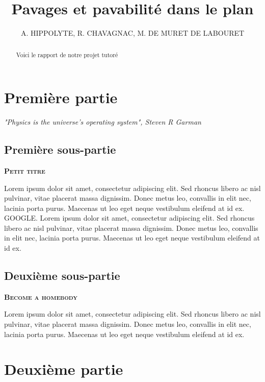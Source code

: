 \documentclass{article}
\title{Pavages et pavabilité dans le plan}
\author{A. HIPPOLYTE, R. CHAVAGNAC, M. DE MURET DE LABOURET}
\begin{document}
\maketitle

\begin{abstract}
    Voici le rapport de notre projet tutoré
\end{abstract}

\tableofcontents

\section{Première partie}

\begin{displayquote}
    \emph{"Physics is the universe’s operating system", Steven R Garman}
\end{displayquote}

\subsection{Première sous-partie}

\textbf{\textsc{Petit titre}}

Lorem ipsum dolor sit amet, consectetur adipiscing elit. Sed rhoncus libero ac nisl pulvinar, 
vitae placerat massa dignissim. Donec metus leo, convallis in elit nec, lacinia porta purus. 
Maecenas ut leo eget neque vestibulum eleifend at id ex. \large GOOGLE. 
\normalsize Lorem ipsum dolor sit amet, consectetur adipiscing elit. Sed rhoncus libero ac nisl pulvinar, 
vitae placerat massa dignissim. Donec metus leo, convallis in elit nec, lacinia porta purus. 
Maecenas ut leo eget neque vestibulum eleifend at id ex. 

\begin{center}
\cite{einstein}

\end{center}
                            

\subsection{Deuxième sous-partie}
\textbf{\textsc{Become a homebody}}

Lorem ipsum dolor sit amet, consectetur adipiscing elit. Sed rhoncus libero ac nisl pulvinar, 
vitae placerat massa dignissim. Donec metus leo, convallis in elit nec, lacinia porta purus. 
Maecenas ut leo eget neque vestibulum eleifend at id ex. 

\section{Deuxième partie}
\end{document}
